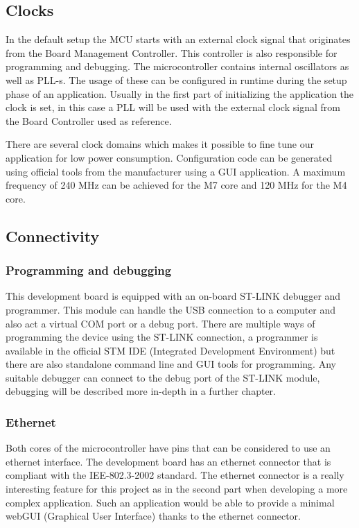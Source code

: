 \subsection{Clocks}

In the default setup the MCU starts with an external clock signal that originates from the Board Management Controller. This controller is also responsible for programming and debugging. The microcontroller contains internal oscillators as well as PLL-s. The usage of these can be configured in runtime during the setup phase of an application. Usually in the first part of initializing the application the clock is set, in this case a PLL will be used with the external clock signal from the Board Controller used as reference.

There are several clock domains which makes it possible to fine tune our application for low power consumption. Configuration code can be generated using official tools from the manufacturer using a GUI application. A maximum frequency of 240 MHz can be achieved for the M7 core and 120 MHz for the M4 core.

\subsection{Connectivity}

\subsubsection{Programming and debugging}

This development board is equipped with an on-board ST-LINK debugger and programmer. This module can handle the USB connection to a computer and also act a virtual COM port or a debug port. There are multiple ways of programming the device using the ST-LINK connection, a programmer is available in the official STM IDE (Integrated Development Environment) but there are also standalone command line and GUI tools for programming. Any suitable debugger can connect to the debug port of the ST-LINK module, debugging will be described more in-depth in a further chapter.

\subsubsection{Ethernet}

Both cores of the microcontroller have pins that can be considered to use an ethernet interface. The development board has an ethernet connector that is compliant with the IEE-802.3-2002 standard. The ethernet connector is a really interesting feature for this project as in the second part when developing a more complex application. Such an application would be able to provide a minimal webGUI (Graphical User Interface) thanks to the ethernet connector.


